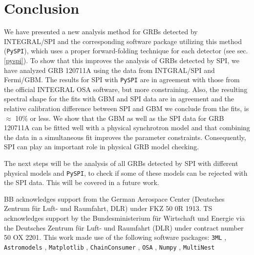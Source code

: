 \documentclass[twocolumn,traditabstract]{aa}
\begin{document}
\section{Conclusion}
\label{conclusion}
We have presented a new analysis method for GRBs detected by INTEGRAL/SPI and the corresponding software package utilizing this method ({\tt PySPI}), which uses a proper forward-folding technique for each detector (see sec. \ref{pyspi}). To show that this improves the analysis of GRBs detected by SPI, we have analyzed GRB 120711A using the data from INTGRAL/SPI and Fermi/GBM. The results for SPI with {\tt PySPI} are in agreement with those from the official INTEGRAL OSA software, but more constraining. Also, the resulting spectral shape for the fits with GBM and SPI data are in agreement and the relative calibration difference between SPI and GBM we conclude from the fits, is $\approx$ 10\% or less. We show that the GBM as well as the SPI data for GRB 120711A can be fitted well with a physical synchrotron model and that combining the data in a simultaneous fit improves the parameter constraints. Consequently, SPI can play an important role in physical GRB model checking.

The next steps will be the analysis of all GRBs detected by SPI with different physical models and {\tt PySPI}, to check if some of these models can be rejected with the SPI data. This will be covered in a future work.

\begin{acknowledgement}
BB acknowledges support from the German Aerospace Center (Deutsches Zentrum f\"ur Luft- und Raumfahrt, DLR) under FKZ 50 0R 1913. TS acknowledges support by the Bundesministerium f\"ur Wirtschaft und Energie via the Deutsches Zentrum f\"ur Luft- und Raumfahrt (DLR) under contract number 50 OX 2201.
This work made use of the following software packages:
{\tt 3ML} \citep{3ML}, {\tt Astromodels} \citep{astromodels}, {\tt Matplotlib} \citep{matplotlib}, {\tt ChainConsumer} \citep{chainconsumer, chainconsumer2}, {\tt OSA} \citep{osa}, {\tt Numpy} \citep{numpy}, {\tt MultiNest} \citep{multinest, multinest1, multinest3}
\end{acknowledgement}
\end{document}
